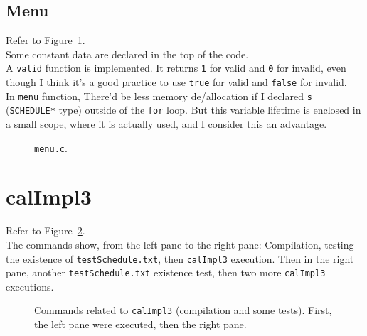 \documentclass{article}
\begin{document}
\subsection*{Menu}
Refer to Figure~\ref{fig:menu}. \\
Some constant data are declared in the top of the code. \\
A {\tt valid} function is implemented. It returns {\tt 1} for valid and {\tt 0} for invalid, even though I think it's a good practice to use {\tt true} for valid and {\tt false} for invalid. \\
In {\tt menu} function, There'd be less memory de/allocation if I declared {\tt s} ({\tt SCHEDULE*} type) outside of the {\tt for} loop. But this variable lifetime is enclosed in a small scope, where it is actually used, and I consider this an advantage. \\
\begin{figure}[h]
  \centering
  \caption{{\tt menu.c}.}
  \label{fig:menu}
\end{figure}

\section*{calImpl3}
Refer to Figure~\ref{fig:calImpl3}. \\
The commands show, from the left pane to the right pane: Compilation, testing the existence of {\tt testSchedule.txt}, then {\tt calImpl3} execution. Then in the right pane, another {\tt testSchedule.txt} existence test, then two more {\tt calImpl3} executions.
\begin{figure}[h]
  \centering
  \caption{Commands related to {\tt calImpl3} (compilation and some tests). First, the left pane were executed, then the right pane.}
  \label{fig:calImpl3}
\end{figure}
\end{document}
